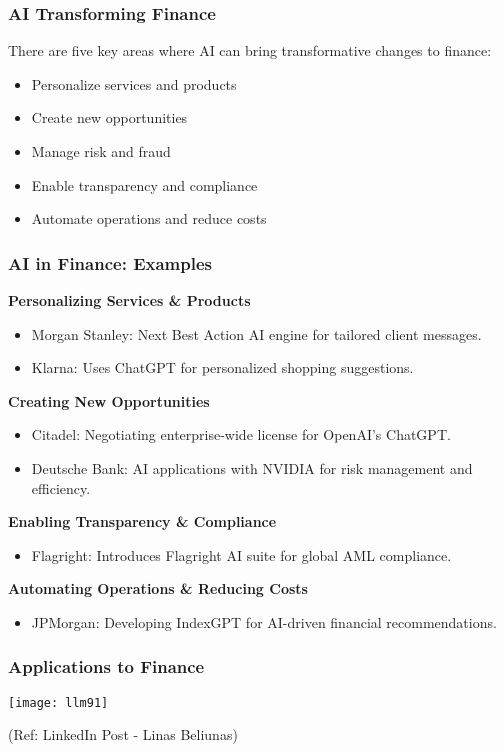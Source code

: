 \begin{frame}[fragile]\frametitle{AI Transforming Finance}
There are five key areas where AI can bring transformative changes to finance:
\begin{itemize}
    \item Personalize services and products
    \item Create new opportunities
    \item Manage risk and fraud
    \item Enable transparency and compliance
    \item Automate operations and reduce costs
\end{itemize}
\end{frame}

\begin{frame}[fragile]\frametitle{AI in Finance: Examples}
\textbf{Personalizing Services \& Products}
\begin{itemize}
    \item Morgan Stanley: Next Best Action AI engine for tailored client messages.
    \item Klarna: Uses ChatGPT for personalized shopping suggestions.
\end{itemize}

\textbf{Creating New Opportunities}
\begin{itemize}
    \item Citadel: Negotiating enterprise-wide license for OpenAI's ChatGPT.
    \item Deutsche Bank: AI applications with NVIDIA for risk management and efficiency.
\end{itemize}

\textbf{Enabling Transparency \& Compliance}
\begin{itemize}
    \item Flagright: Introduces Flagright AI suite for global AML compliance.
\end{itemize}

\textbf{Automating Operations \& Reducing Costs}
\begin{itemize}
    \item JPMorgan: Developing IndexGPT for AI-driven financial recommendations.
\end{itemize}
\end{frame}


\begin{frame}[fragile]\frametitle{Applications to Finance}
\begin{center}
\texttt{[image: llm91]}
\end{center}

{\tiny (Ref: LinkedIn Post - Linas Beliunas)}
\end{frame}
